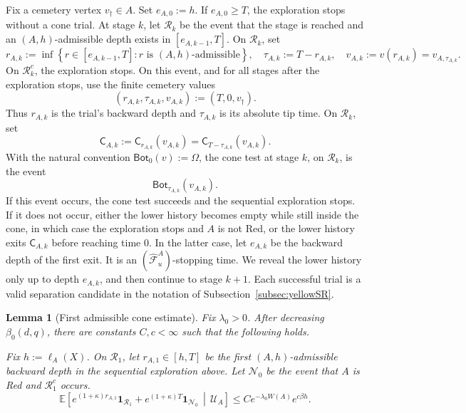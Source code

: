 \documentclass[letterpaper,11pt,reqno]{amsart}
\newtheorem{lemma}[thm]{Lemma}
\theoremstyle{definition}
\begin{document}
Fix a cemetery vertex \(v_\dagger\in A\).
Set \(e_{A,0}:=h\). If \(e_{A,0}\ge T\), the exploration stops without a
cone trial. At stage \(k\), let \(\mathcal R_k\) be the
event that the stage is reached and an \((A,h)\)-admissible depth
exists in \([e_{A,k-1},T]\). On \(\mathcal R_k\), set
\[
    r_{A,k}
    :=
    \inf\left\{
        r\in[e_{A,k-1},T]:
        r\text{ is \((A,h)\)-admissible}
    \right\},
    \quad
    \tau_{A,k}:=T-r_{A,k},
    \quad
    v_{A,k}:=v(r_{A,k})=v_{A,\tau_{A,k}}.
\]
On \(\mathcal R_k^c\), the exploration stops. On this event, and for all
stages after the exploration stops, use the
finite cemetery values
\[
        (r_{A,k},\tau_{A,k},v_{A,k}):=(T,0,v_\dagger).
\]
Thus \(r_{A,k}\) is the trial's backward depth and \(\tau_{A,k}\) is its
absolute tip time. On \(\mathcal R_k\), set
\[
         \mathsf C_{A,k}
         :=\mathsf C_{r_{A,k}}(v_{A,k})
         =\mathsf C_{T-\tau_{A,k}}(v_{A,k}).
\]
With the natural convention \(\mathsf{Bot}_0(v):=\Omega\), the cone test at
stage \(k\), on \(\mathcal R_k\), is the event
\[
        \mathsf{Bot}_{\tau_{A,k}}(v_{A,k}).
\]
If this event
occurs, the cone test succeeds and the sequential exploration stops. If it
does not occur, either the lower history becomes empty while still inside the
cone, in which case the exploration stops and \(A\) is not Red, or the lower
history exits \(\mathsf C_{A,k}\) before reaching time \(0\). In the latter
case, let \(e_{A,k}\) be the backward depth of the first exit. It is an
\((\widehat{\mathscr F}_u^A)\)-stopping time. We reveal the lower history only up to
depth \(e_{A,k}\), and then continue to stage \(k+1\).
Each successful trial is a valid separation candidate in the notation of
Subsection~\ref{subsec:yellowSR}.











\begin{lemma}[First admissible cone estimate]
\label{lem:first-h-admissible}
Fix \(\lambda_0>0\). After decreasing
\(\beta_0(d,q)\), there are constants \(C,c<\infty\) such that the following
holds.

Fix \(h:=\ell_A(X)\). On \(\mathcal R_1\), let \(r_{A,1}\in[h,T]\) be the
first \((A,h)\)-admissible backward depth in the sequential exploration above. Let
\(\mathcal N_0\) be the event that \(A\) is Red and \(\mathcal R_1^c\) occurs.
\[
        \mathbb E
        \left[
            e^{(1+\kappa)r_{A,1}}\mathbf 1_{\mathcal R_1}
            +
            e^{(1+\kappa)T}\mathbf 1_{\mathcal N_0}
            \,\middle|\,
            \mathcal U_A
        \right]
        \le
        C e^{-\lambda_0 W(A)}e^{c\beta h}.
\]
\end{lemma}
\end{document}

